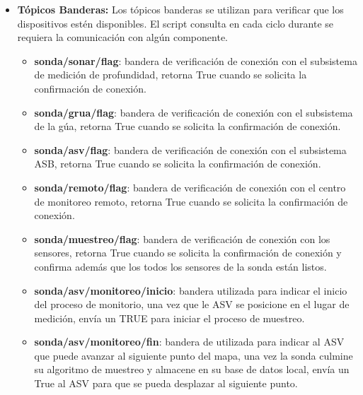 \begin{appendices}
\begin{itemize}
    \item \textbf{T\'opicos Banderas:} Los t\'opicos banderas se utilizan para verificar que los dispositivos est\'en disponibles. El script consulta en cada ciclo durante se requiera la comunicaci\'on con alg\'un componente.
    \begin{itemize}
        \item \textbf{sonda/sonar/flag}: bandera de verificaci\'on de conexi\'on con el subsistema de medici\'on de profundidad, retorna True cuando se solicita la confirmaci\'on de conexi\'on.
        \item \textbf{sonda/grua/flag}: bandera de verificaci\'on de conexi\'on con el subsistema de la g\'ua, retorna True cuando se solicita la confirmaci\'on de conexi\'on.
        \item \textbf{sonda/asv/flag}: bandera de verificaci\'on de conexi\'on con el subsistema ASB, retorna True cuando se solicita la confirmaci\'on de conexi\'on.
        \item \textbf{sonda/remoto/flag}: bandera de verificaci\'on de conexi\'on con el centro de monitoreo remoto, retorna True cuando se solicita la confirmaci\'on de conexi\'on.
        \item \textbf{sonda/muestreo/flag}: bandera de verificaci\'on de conexi\'on con los sensores, retorna True cuando se solicita la confirmaci\'on de conexi\'on y confirma adem\'as que los todos los sensores de la sonda están listos.
        \item \textbf{sonda/asv/monitoreo/inicio}: bandera utilizada para indicar el inicio del proceso de monitorio, una vez que le ASV se posicione en el lugar de medici\'on, env\'ia un TRUE para iniciar el proceso de muestreo.
        \item \textbf{sonda/asv/monitoreo/fin}: bandera de utilizada para indicar al ASV que puede avanzar al siguiente punto del mapa, una vez la sonda culmine su algoritmo de muestreo y almacene en su base de datos local, env\'ia un True al ASV para que se pueda desplazar al siguiente punto.



\end{itemize}
\end{itemize}
\end{appendices}
